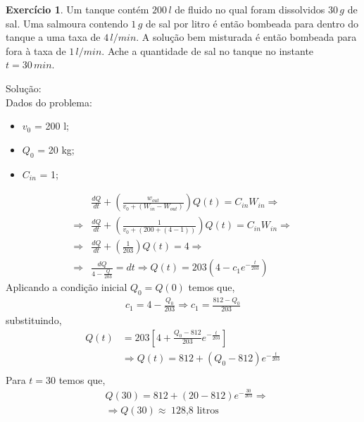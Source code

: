 \documentclass[a4paper,12pt,reqno,natbib]{amsart}
\theoremstyle{definition}
\newtheorem{exercise}{Exerc\'icio}
\begin{document}
\begin{exercise}
Um tanque contém $200\,l$ de fluido no qual foram dissolvidos $30\,g$ de sal. Uma salmoura contendo $1\,g$ de sal por litro é então bombeada para dentro do tanque a uma taxa de 
$4\,l/min$. A solução bem misturada é então bombeada para fora à taxa de $1\,l/min$. Ache a quantidade de sal no tanque no instante $t = 30\,min$.
\end{exercise}
Solu\c c\~ao:\\
Dados do problema:
\begin{itemize}
	\item $v_0   $ = 200 l;
	\item $Q_0   $  = 20 kg;
	\item $C_{in}$ = 1;
\end{itemize}
\begin{align*}
	&\frac{dQ}{dt} +\left (\frac{w_{out}}{v_0 + (W_{in} - W_{out})}\right ) Q(t) = C_{in}W_{in} \Rightarrow \\
	\Rightarrow &\frac{dQ}{dt} +\left (\frac{1}{v_0 + (200 + (4 - 1))}\right ) Q(t) = C_{in}W_{in} \Rightarrow\\
	\Rightarrow &\frac{dQ}{dt} +\left (\frac{1}{203}\right ) Q(t) = 4 \Rightarrow\\
	\Rightarrow &\frac{dQ}{4 - \frac{Q}{203}} = dt \Rightarrow Q(t) = 203 (4 - c_1e^{-\frac{t}{203}})
\end{align*}
Aplicando a condi\c c\~ao inicial $Q_0 = Q(0)$ temos que,
\begin{align*}
	c_1 = 4 - \frac{Q_0}{203} \Rightarrow c_1 = \frac{812 - Q_0}{203}
\end{align*}
substituindo,
\begin{align*}
	Q(t) &= 203\left [ 4 + \frac{Q_0 - 812}{203}e^{-\frac{t}{203}}\right ]  \\
	&\Rightarrow \boxed {Q(t) = 812 +\left (Q_0 - 812\right )e^{-\frac{t}{203}}} \\
\end{align*}
Para $t = 30$ temos que,
\begin{align*}
	&Q(30) = 812 +\left (20 - 812\right )e^{-\frac{30}{203}} \Rightarrow \\
	&\Rightarrow \boxed{Q(30) \approx \hspace{3pt} \mbox{128,8 litros}}
\end{align*}

\vspace{0.6 cm}
\end{document}
